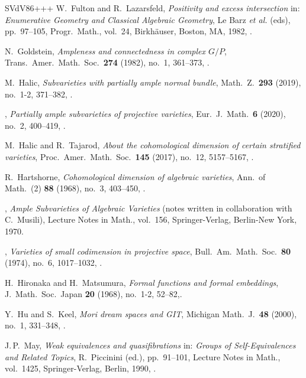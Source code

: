 \begin{thebibliography}{SVdV86+++}
W.~Fulton and R.~Lazarsfeld, \emph{Positivity and excess intersection} in: \emph{Enumerative Geometry and Classical Algebraic Geometry}, Le Barz \textit{et al.} (eds), pp.~97--105, Progr.\ Math., vol.~24, Birkh\"auser, Boston, MA, 1982, .

N.~Goldstein, \emph{Ampleness and connectedness in complex $G/P$}, Trans.\ Amer.\ Math.\ Soc.\ \textbf{274} (1982), no.~1, 361--373, .

M.~Halic, \emph{Subvarieties with partially ample normal bundle}, Math.~Z.\ \textbf{293} (2019), no.~1-2, 371--382, .

\bysame,  \emph{Partially ample subvarieties of projective varieties}, Eur.~J.\ Math.\ \textbf{6} (2020), no.~2, 400--419, .

M.~Halic and R.~Tajarod, \emph{About the cohomological dimension of certain stratified varieties}, Proc.\ Amer.~Math.\ Soc.\ \textbf{145} (2017), no.~12, 5157--5167, .

R.~Hartshorne,  \emph{Cohomological dimension of algebraic varieties}, Ann.\ of Math.~(2) \textbf{88} (1968), no.~3, 403--450, .

  \bysame, \emph{Ample Subvarieties of Algebraic Varieties} (notes written in collaboration with C.~Musili), Lecture Notes in Math., vol.~156, Springer-Verlag, Berlin-New York, 1970.

  \bysame, \emph{Varieties of small codimension in projective space}, Bull.\ Am.\ Math.\ Soc.\ \textbf{80} (1974), no.~6, 1017--1032, .

H.~Hironaka and H.~Matsumura, \emph{Formal functions and formal embeddings}, J.~Math.\ Soc.\ Japan \textbf{20} (1968), no.~1-2, 52--82,.

Y.~Hu and S.~Keel,  \emph{Mori dream spaces and GIT}, Michigan Math.~J.\ \textbf{48} (2000), no.~1, 331--348, .

J.\,P.~May,  \emph{Weak equivalences and quasifibrations} in: \emph{Groups of Self-Equivalences and Related Topics}, R.~Piccinini (ed.), pp.~91--101, Lecture Notes in Math., vol.~1425, Springer-Verlag, Berlin, 1990, .


\end{thebibliography}
